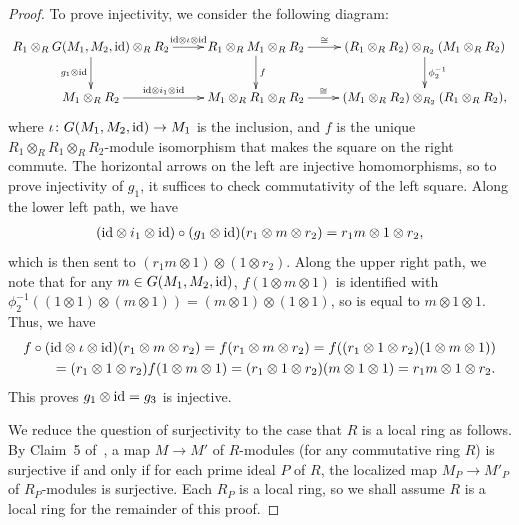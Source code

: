 \documentclass[pdftex]{sigma}
\theoremstyle{definition}
\begin{document}
\begin{proof}
To prove injectivity, we consider the following diagram:
\begin{gather*} \xymatrix{ R_1 \otimes_{R} G(M_1, M_2,{\rm id}) \otimes_{R} R_2 \ar[r]^-{{\rm id} \otimes \iota \otimes {\rm id}} \ar[d]_{g_1 \otimes {\rm id}} & R_1 \otimes_{R} M_1 \otimes_{R} R_2 \ar[r]^-{\cong} \ar[d]^{f} & (R_1 \otimes_{R} R_2) \otimes_{R_2} (M_1 \otimes_{R} R_2) \ar[d]^{\phi_2^{-1}} \\
M_1 \otimes_{R} R_2 \ar[r]^-{{\rm id} \otimes i_1 \otimes {\rm id}} & M_1 \otimes_{R} R_1 \otimes_{R} R_2 \ar[r]^-{\cong} & (M_1 \otimes_{R} R_2) \otimes_{R_2} (R_1 \otimes_{R} R_2), } \end{gather*}
where $\iota\colon G(M_1, M_2,{\rm id}) \to M_1$ is the inclusion, and $f$ is the unique $R_1 \otimes_{R} R_1 \otimes_{R} R_2$-module isomorphism that makes the square on the right commute. The horizontal arrows on the left are injective homomorphisms, so to prove injectivity of $g_1$, it suffices to check commutativity of the left square. Along the lower left path, we have
\begin{gather*} ({\rm id} \otimes i_1 \otimes {\rm id}) \circ (g_1 \otimes {\rm id})(r_1 \otimes m \otimes r_2) = r_1m \otimes 1 \otimes r_2, \end{gather*}
which is then sent to $(r_1m \otimes 1) \otimes (1 \otimes r_2)$. Along the upper right path, we note that for any $m \in G(M_1, M_2,{\rm id})$, $f(1 \otimes m \otimes 1)$ is identified with $\phi_2^{-1}((1 \otimes 1) \otimes (m \otimes 1)) = (m \otimes 1) \otimes (1 \otimes 1)$, so is equal to $m \otimes 1 \otimes 1$. Thus, we have{\samepage
\begin{gather*}
f \circ ({\rm id} \otimes \iota \otimes {\rm id})(r_1 \otimes m \otimes r_2) = f(r_1 \otimes m \otimes r_2)= f((r_1 \otimes 1 \otimes r_2)(1 \otimes m \otimes 1)) \\
\qquad{} = (r_1 \otimes 1 \otimes r_2) f(1 \otimes m \otimes 1) = (r_1 \otimes 1 \otimes r_2) (m \otimes 1 \otimes 1)
 = r_1 m \otimes 1 \otimes r_2.
\end{gather*}
This proves $g_1 \otimes {\rm id} = g_3$ is injective.}

We reduce the question of surjectivity to the case that $R$ is a local ring as follows. By Claim~5 of~\cite[\href{https://stacks.math.columbia.edu/tag/00HN}{Lemma 00HN}]{Stacks}, a map $M \to M'$ of $R$-modules (for any commutative ring $R$) is surjective if and only if for each prime ideal $P$ of $R$, the localized map $M_P \to M'_P$ of $R_P$-modules is surjective. Each $R_P$ is a local ring, so we shall assume $R$ is a local ring for the remainder of this proof.


\end{proof}
\end{document}

